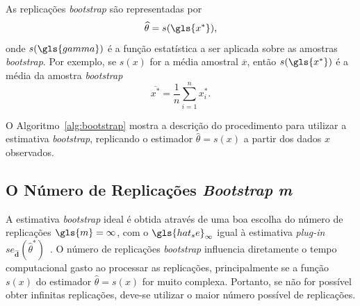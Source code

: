 As replicações \textit{bootstrap} são representadas por
\begin{equation}
    \widehat{\theta} = s(\gls{x^*}),
\end{equation}
onde $s(\gls{gamma})$ é a função estatística a ser aplicada sobre as amostras \textit{bootstrap}. Por exemplo, se $s(x)$ for a média amostral $\overline{x}$, então $s(\gls{x^*})$ é a média da amostra \textit{bootstrap}
\begin{equation}
    \overline{x^*} = \frac{1}{n} \sum_{i=1}^{n} x_i^*.
\end{equation}

\medskip
\begin{minipage}{0.80\textwidth}
\begin{algorithm2e}[H]
 \dontprintsemicolon %
 \linesnumbered%
 \SetLine
 \BlankLine
 \BlankLine
{}
\caption{Estimativa das replicações \textit{bootstrap}. \label{alg:bootstrap}}
\end{algorithm2e}
\end{minipage}

O Algoritmo~\ref{alg:bootstrap} \cite{EFRON:1993} mostra a descrição do procedimento para
utilizar a estimativa \textit{bootstrap}, replicando o estimador $\widehat{\theta} = s(x)$ a partir dos dados $x$ observados.

\subsection{O Número de Replicações \textit{Bootstrap} \textit{m}}
\label{sec:numreplboot}
A estimativa \textit{bootstrap} ideal é obtida através de uma boa escolha do número de replicações
$\gls{m} = \infty$, com o $\gls{hat_se}_{\infty}$ igual à estimativa \textit{plug-in} $se_{\widehat{\textbf{d}}}(\widehat{\theta}^*)$~\cite{EFRON:1993}.
O número de replicações \textit{bootstrap} influencia diretamente o tempo computacional
gasto ao processar as replicações, principalmente se a função $s(x)$ do estimador $\widehat{\theta} = s(x)$ for muito
complexa. Portanto, se não for possível obter infinitas replicações, deve-se utilizar o maior número possível de replicações.

